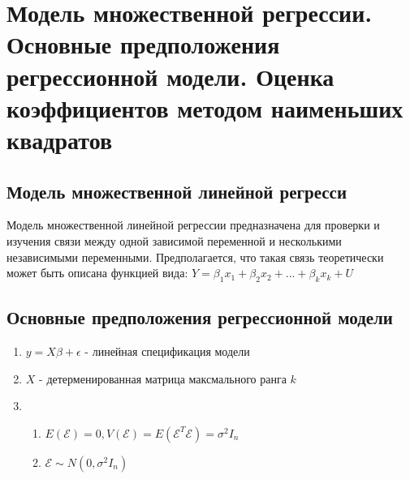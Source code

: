 \documentclass[../document.tex]{subfiles}
\begin{document}
\section{Модель множественной регрессии. Основные предположения регрессионной модели. Оценка коэффициентов методом наименьших квадратов}
	\subsection{Модель множественной линейной регресси}
	\par Модель множественной линейной регрессии предназначена для проверки и изучения связи между одной зависимой переменной и несколькими независимыми  переменными. Предполагается, что такая связь теоретически может быть описана  функцией вида: $Y = \beta_1x_1 + \beta_2x_2 + ... + \beta_kx_k + U$
	
	\subsection{Основные предположения регрессионной модели}
	\begin{enumerate}
		\item $y = X\beta + \epsilon$ - линейная спецификация модели
		\item $X$ - детерменированная матрица максмального ранга $k$
		\item \begin{enumerate}
			\item $E(\mathcal{E}) = 0, V(\mathcal{E}) = E(\mathcal{E}^T\mathcal{E}) = \sigma^2I_n$
			\item $\mathcal{E} \sim N(0, \sigma^2I_n)$
		\end{enumerate}
	\end{enumerate}
\end{document}
